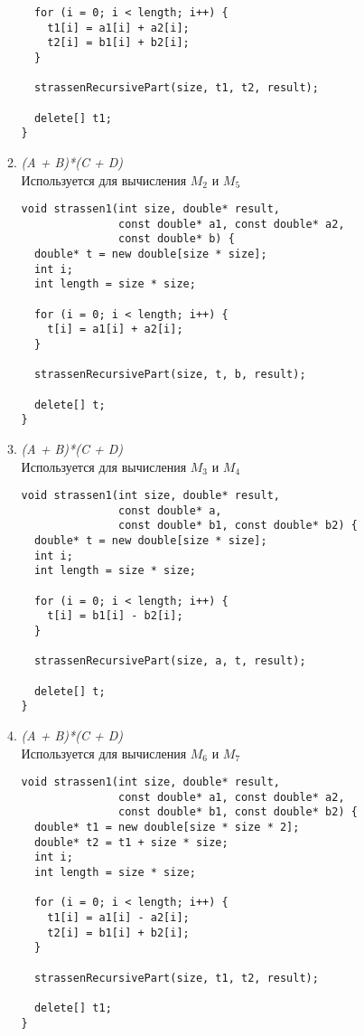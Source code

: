 \documentclass{report}
\begin{document}
\begin{center}
\begin{enumerate}
\begin{enumerate}[label*=\arabic*.]
\begin{lstlisting}
  for (i = 0; i < length; i++) {
    t1[i] = a1[i] + a2[i];
    t2[i] = b1[i] + b2[i];
  }

  strassenRecursivePart(size, t1, t2, result);

  delete[] t1;
}
\end{lstlisting}

\item \textit{(A + B)*(C + D)}\\
Используется для вычисления $M_2$ и $M_5$
\begin{lstlisting}
void strassen1(int size, double* result,
               const double* a1, const double* a2,
               const double* b) {
  double* t = new double[size * size];
  int i;
  int length = size * size;

  for (i = 0; i < length; i++) {
    t[i] = a1[i] + a2[i];
  }

  strassenRecursivePart(size, t, b, result);

  delete[] t;
}
\end{lstlisting}

\item \textit{(A + B)*(C + D)}\\
Используется для вычисления $M_3$ и $M_4$
\begin{lstlisting}
void strassen1(int size, double* result,
               const double* a,
               const double* b1, const double* b2) {
  double* t = new double[size * size];
  int i;
  int length = size * size;

  for (i = 0; i < length; i++) {
    t[i] = b1[i] - b2[i];
  }

  strassenRecursivePart(size, a, t, result);

  delete[] t;
}
\end{lstlisting}

\item \textit{(A + B)*(C + D)}\\
Используется для вычисления $M_6$ и $M_7$
\begin{lstlisting}
void strassen1(int size, double* result,
               const double* a1, const double* a2,
               const double* b1, const double* b2) {
  double* t1 = new double[size * size * 2];
  double* t2 = t1 + size * size;
  int i;
  int length = size * size;

  for (i = 0; i < length; i++) {
    t1[i] = a1[i] - a2[i];
    t2[i] = b1[i] + b2[i];
  }

  strassenRecursivePart(size, t1, t2, result);

  delete[] t1;
}
\end{lstlisting}
\end{enumerate}


\end{enumerate}
\end{center}
\end{document}
